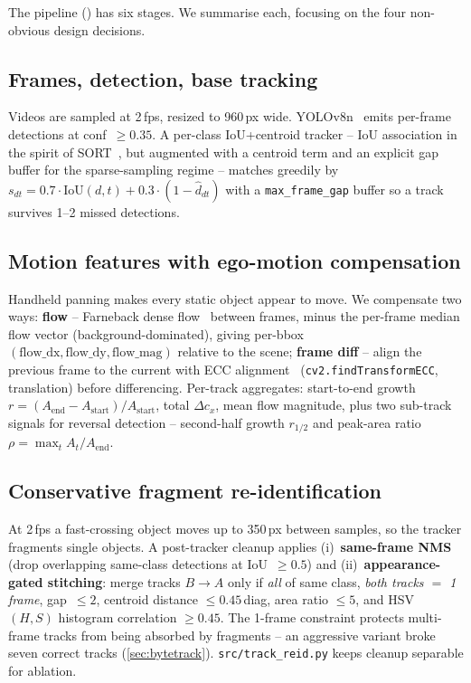\documentclass[10pt,twocolumn,letterpaper]{article}
\begin{document}
The pipeline () has six stages. We summarise each,
focusing on the four non-obvious design decisions.

\subsection{Frames, detection, base tracking}
Videos are sampled at 2\,fps, resized to 960\,px wide.
YOLOv8n~\cite{ultralytics} emits per-frame detections at
conf~$\ge\!0.35$. A per-class IoU+centroid tracker -- IoU association
in the spirit of SORT~\cite{sort}, but augmented with a centroid term
and an explicit gap buffer for the sparse-sampling regime -- matches
greedily by
$s_{dt}=0.7\cdot\textrm{IoU}(d,t)+0.3\cdot(1-\hat d_{dt})$ with a
\texttt{max\_frame\_gap} buffer so a track survives 1--2 missed
detections.

\subsection{Motion features with ego-motion compensation}
\label{sec:motion}
Handheld panning makes every static object appear to move. We
compensate two ways: \textbf{flow} -- Farneback dense
flow~\cite{farneback} between frames, minus the per-frame median flow
vector (background-dominated), giving per-bbox
$(\textrm{flow\_dx},\textrm{flow\_dy},\textrm{flow\_mag})$
relative to the scene; \textbf{frame diff} -- align the previous
frame to the current with ECC alignment~\cite{ecc}
(\texttt{cv2.findTransformECC}, translation) before differencing. Per-track aggregates: start-to-end
growth $r=(A_{\textrm{end}}-A_{\textrm{start}})/A_{\textrm{start}}$,
total $\Delta\!c_x$, mean flow magnitude, plus two sub-track signals
for reversal detection -- second-half growth $r_{1/2}$ and peak-area
ratio $\rho=\max_t A_t / A_{\textrm{end}}$.

\subsection{Conservative fragment re-identification}
\label{sec:reid}
At 2\,fps a fast-crossing object moves up to 350\,px between samples,
so the tracker fragments single objects. A post-tracker cleanup
applies (i)~\textbf{same-frame NMS} (drop overlapping same-class
detections at IoU~$\ge\!0.5$) and (ii)~\textbf{appearance-gated
stitching}: merge tracks $B\!\to\!A$ only if \emph{all} of same class,
\emph{both tracks $=$ 1 frame}, gap~$\le\!2$, centroid distance
$\le\!0.45$\,diag, area ratio $\le\!5$, and HSV $(H,S)$ histogram
correlation $\ge\!0.45$. The 1-frame constraint protects multi-frame
tracks from being absorbed by fragments -- an aggressive variant
broke seven correct tracks (\cref{sec:bytetrack}).
\texttt{src/track\_reid.py} keeps cleanup separable for ablation.
\end{document}
